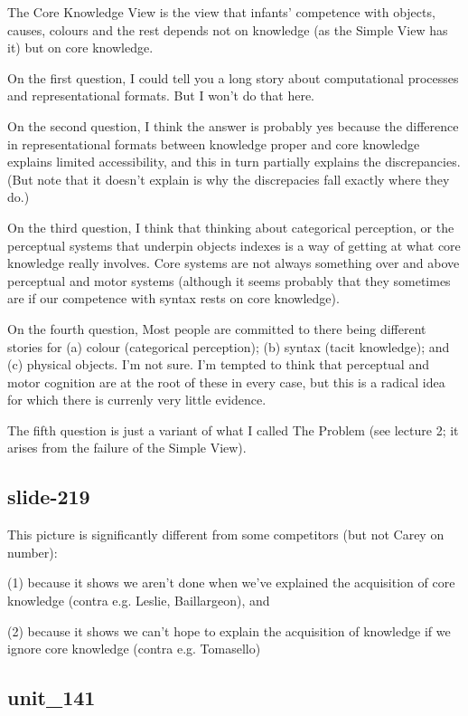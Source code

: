 \documentclass[12pt,\papersize]{extarticle}
\begin{document}
The Core Knowledge View is the view that infants' competence with objects, causes, colours
and the rest depends not on knowledge (as the Simple View has it) but on core knowledge.
 
On the first question, I could tell you a long story about computational processes and 
representational formats.  But I won't do that here.
 
On the second question, I think the answer is probably yes because the difference in
representational formats between knowledge proper and core knowledge explains limited
accessibility, and this in turn partially explains the discrepancies.
(But note that it doesn't explain is why the discrepacies fall exactly where they do.)
 
On the third question, I think that thinking about categorical perception, or the perceptual 
systems that underpin objects indexes is a way of getting at what core knowledge really 
involves.  Core systems are not always something over and above perceptual and motor systems
(although it seems probably that they sometimes are if our competence with syntax rests on 
core knowledge).
 
On the fourth question,
Most people are committed to there being different stories for (a) colour (categorical 
perception); (b) syntax (tacit knowledge); and (c) physical objects.
I'm not sure. I'm tempted to think that perceptual and motor cognition are at the root of these 
in every case, but this is a radical idea for which there is currenly very little evidence.
 
The fifth question is just a variant of what I called The Problem (see lecture 2; it arises 
from the failure of the Simple View).
 
\subsection{slide-219}
This picture is significantly different from some competitors (but not Carey on number):
 
(1) because it shows we aren't done when we've explained the acquisition of core knowledge (contra e.g. Leslie, Baillargeon), and
 
(2) because it shows we can't hope to explain the acquisition of knowledge if we ignore core knowledge (contra e.g. Tomasello)
 
\subsection{unit\_141}
 
\end{document}
